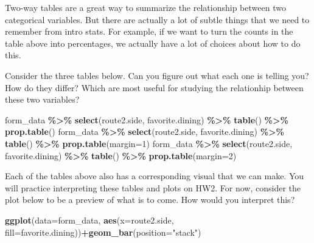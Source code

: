 \documentclass[
]{article}
\newenvironment{Shaded}{\begin{snugshade}}{\end{snugshade}}
\newcommand{\AttributeTok}[1]{\textcolor[rgb]{0.13,0.29,0.53}{#1}}
\newcommand{\DecValTok}[1]{\textcolor[rgb]{0.00,0.00,0.81}{#1}}
\newcommand{\FunctionTok}[1]{\textcolor[rgb]{0.13,0.29,0.53}{\textbf{#1}}}
\newcommand{\NormalTok}[1]{#1}
\newcommand{\SpecialCharTok}[1]{\textcolor[rgb]{0.81,0.36,0.00}{\textbf{#1}}}
\newcommand{\StringTok}[1]{\textcolor[rgb]{0.31,0.60,0.02}{#1}}
\begin{document}
Two-way tables are a great way to summarize the relationship between two
categorical variables. But there are actually a lot of subtle things
that we need to remember from intro stats. For example, if we want to
turn the counts in the table above into percentages, we actually have a
lot of choices about how to do this.

Consider the three tables below. Can you figure out what each one is
telling you? How do they differ? Which are most useful for studying the
relationhip between these two variables?

\begin{Shaded}
\begin{Highlighting}[]
\NormalTok{form\_data }\SpecialCharTok{\%\textgreater{}\%} \FunctionTok{select}\NormalTok{(route2.side, favorite.dining) }\SpecialCharTok{\%\textgreater{}\%} \FunctionTok{table}\NormalTok{() }\SpecialCharTok{\%\textgreater{}\%} \FunctionTok{prop.table}\NormalTok{()}
\NormalTok{form\_data }\SpecialCharTok{\%\textgreater{}\%} \FunctionTok{select}\NormalTok{(route2.side, favorite.dining) }\SpecialCharTok{\%\textgreater{}\%} \FunctionTok{table}\NormalTok{() }\SpecialCharTok{\%\textgreater{}\%} \FunctionTok{prop.table}\NormalTok{(}\AttributeTok{margin=}\DecValTok{1}\NormalTok{)}
\NormalTok{form\_data }\SpecialCharTok{\%\textgreater{}\%} \FunctionTok{select}\NormalTok{(route2.side, favorite.dining) }\SpecialCharTok{\%\textgreater{}\%} \FunctionTok{table}\NormalTok{() }\SpecialCharTok{\%\textgreater{}\%} \FunctionTok{prop.table}\NormalTok{(}\AttributeTok{margin=}\DecValTok{2}\NormalTok{)}
\end{Highlighting}
\end{Shaded}

Each of the tables above also has a corresponding visual that we can
make. You will practice interpreting these tables and plots on HW2. For
now, consider the plot below to be a preview of what is to come. How
would you interpret this?

\begin{Shaded}
\begin{Highlighting}[]
\FunctionTok{ggplot}\NormalTok{(}\AttributeTok{data=}\NormalTok{form\_data, }\FunctionTok{aes}\NormalTok{(}\AttributeTok{x=}\NormalTok{route2.side, }\AttributeTok{fill=}\NormalTok{favorite.dining))}\SpecialCharTok{+}\FunctionTok{geom\_bar}\NormalTok{(}\AttributeTok{position=}\StringTok{"stack"}\NormalTok{)}
\end{Highlighting}
\end{Shaded}
\end{document}
